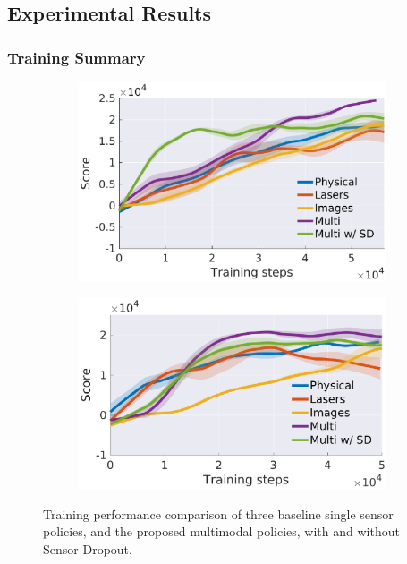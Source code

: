 \documentclass[../thesis.tex]{subfiles}
\begin{document}
 
\subsection{Experimental Results} %
\subsubsection{Training Summary}
 
\begin{figure}[t]
	\centering
	\begin{subfigure}[b]{0.48\linewidth}
    	\includegraphics[width=\columnwidth]{./MultimodalDRL/fig/training_step_naf_without_aux}
    	\label{fig:training_exp_naf}
	\end{subfigure}
	\begin{subfigure}[b]{0.48\linewidth}
    	\includegraphics[width=\columnwidth]{./MultimodalDRL/fig/training_step_ddpg_without_aux}
    	\label{fig:training_exp_ddpg}
	\end{subfigure}
	\caption{Training performance comparison of three baseline single sensor policies, and the proposed multimodal policies, with and without Sensor Dropout.}
	\label{fig:training_exp}
\end{figure}
 
\end{document}

